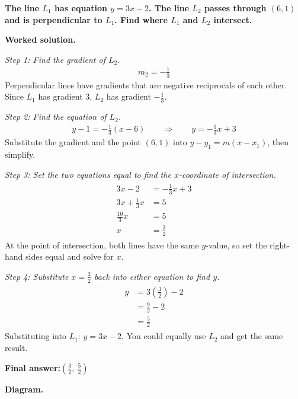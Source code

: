 \documentclass[11pt]{article}
\newcommand{\question}[1]{\par\medskip\noindent\textbf{#1}\par}
\begin{document}
\question{The line \( L_1 \) has equation \( y = 3x - 2 \). The line \( L_2 \) passes through \( (6, 1) \) and is perpendicular to \( L_1 \). Find where \( L_1 \) and \( L_2 \) intersect.}

\textbf{Worked solution.}

\textit{Step 1: Find the gradient of \(L_2\).}
\[\begin{gathered}
m_2 = -\frac{1}{3}
\end{gathered}\]
Perpendicular lines have gradients that are negative reciprocals of each other. Since \(L_1\) has gradient 3, \(L_2\) has gradient \(-\frac{1}{3}\).

\textit{Step 2: Find the equation of \(L_2\).}
\[\begin{gathered}
y - 1 = -\frac{1}{3}(x - 6) \quad\quad \Rightarrow \quad\quad y = -\frac{1}{3}x + 3
\end{gathered}\]
Substitute the gradient and the point \((6, 1)\) into \(y - y_1 = m(x - x_1)\), then simplify.

\textit{Step 3: Set the two equations equal to find the \(x\)-coordinate of intersection.}
\[\begin{gathered}
\begin{aligned} 3x - 2 &= -\frac{1}{3}x + 3 \\ 3x + \frac{1}{3}x &= 5 \\ \frac{10}{3}x &= 5 \\ x &= \frac{3}{2} \end{aligned}
\end{gathered}\]
At the point of intersection, both lines have the same \(y\)-value, so set the right-hand sides equal and solve for \(x\).

\textit{Step 4: Substitute \(x = \frac{3}{2}\) back into either equation to find \(y\).}
\[\begin{gathered}
\begin{aligned} y &= 3\left(\frac{3}{2}\right) - 2 \\ &= \frac{9}{2} - 2 \\ &= \frac{5}{2} \end{aligned}
\end{gathered}\]
Substituting into \(L_1\): \(y = 3x - 2\). You could equally use \(L_2\) and get the same result.

\begin{answerbox}
\textbf{Final answer:}\quad \(\displaystyle \left(\frac{3}{2},\ \frac{5}{2}\right)\)
\end{answerbox}
\textbf{Diagram.}
\end{document}
